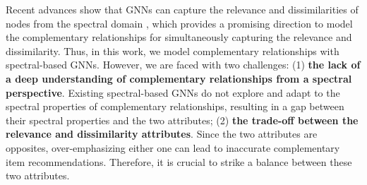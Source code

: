 \documentclass[letterpaper]{article} %
\begin{document}
Recent advances show that GNNs can capture the relevance and dissimilarities of nodes from the spectral domain \cite{wu2022beyond, tang2022rethinking}, which provides a promising direction to model the complementary relationships for simultaneously capturing the relevance and dissimilarity. Thus, in this work, we model complementary relationships with spectral-based GNNs. However, we are faced with two challenges: (1) \textbf{the lack of a deep understanding of complementary relationships from a spectral perspective}. Existing spectral-based GNNs do not explore and adapt to the spectral properties of complementary relationships, resulting in a gap between their spectral properties and the two attributes; (2) \textbf{the trade-off between the relevance and dissimilarity attributes}. Since the two attributes are opposites, over-emphasizing either one can lead to inaccurate complementary item recommendations. Therefore, it is crucial to strike a balance between these two attributes.
\end{document}
